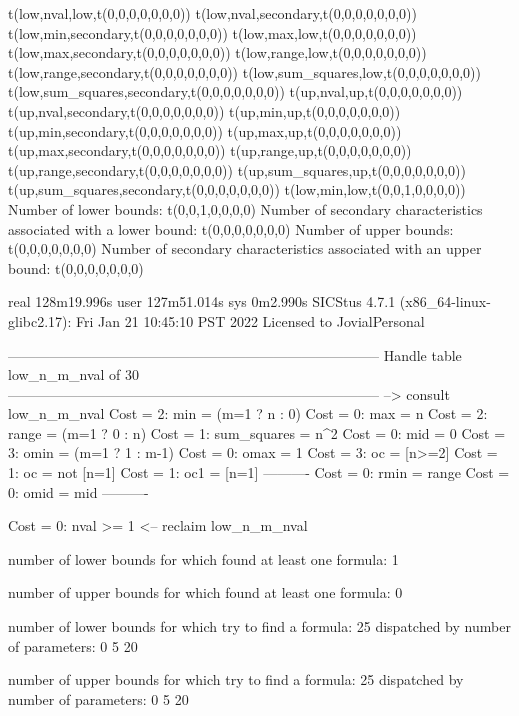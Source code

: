 t(low,nval,low,t(0,0,0,0,0,0,0))
t(low,nval,secondary,t(0,0,0,0,0,0,0))
t(low,min,secondary,t(0,0,0,0,0,0,0))
t(low,max,low,t(0,0,0,0,0,0,0))
t(low,max,secondary,t(0,0,0,0,0,0,0))
t(low,range,low,t(0,0,0,0,0,0,0))
t(low,range,secondary,t(0,0,0,0,0,0,0))
t(low,sum_squares,low,t(0,0,0,0,0,0,0))
t(low,sum_squares,secondary,t(0,0,0,0,0,0,0))
t(up,nval,up,t(0,0,0,0,0,0,0))
t(up,nval,secondary,t(0,0,0,0,0,0,0))
t(up,min,up,t(0,0,0,0,0,0,0))
t(up,min,secondary,t(0,0,0,0,0,0,0))
t(up,max,up,t(0,0,0,0,0,0,0))
t(up,max,secondary,t(0,0,0,0,0,0,0))
t(up,range,up,t(0,0,0,0,0,0,0))
t(up,range,secondary,t(0,0,0,0,0,0,0))
t(up,sum_squares,up,t(0,0,0,0,0,0,0))
t(up,sum_squares,secondary,t(0,0,0,0,0,0,0))
t(low,min,low,t(0,0,1,0,0,0,0))
Number of lower bounds:                                             t(0,0,1,0,0,0,0)
Number of secondary characteristics associated with a lower bound:  t(0,0,0,0,0,0,0)
Number of upper bounds:                                             t(0,0,0,0,0,0,0)
Number of secondary characteristics associated with an upper bound: t(0,0,0,0,0,0,0)

real	128m19.996s
user	127m51.014s
sys	0m2.990s
SICStus 4.7.1 (x86_64-linux-glibc2.17): Fri Jan 21 10:45:10 PST 2022
Licensed to JovialPersonal


--------------------------------------------------------------------------------
Handle table low_n_m_nval of 30
--------------------------------------------------------------------------------
--> consult low_n_m_nval
Cost =  2:  min         = (m=1 ? n : 0)
Cost =  0:  max         = n
Cost =  2:  range       = (m=1 ? 0 : n)
Cost =  1:  sum_squares = n^2
Cost =  0:  mid         = 0
Cost =  3:  omin        = (m=1 ? 1 : m-1)
Cost =  0:  omax        = 1
Cost =  3:  oc          = [n>=2]
Cost =  1:  oc          = not [n=1]
Cost =  1:  oc1         = [n=1]
----------
Cost =  0:  rmin        = range
Cost =  0:  omid        = mid
----------

Cost =  0:  nval >= 1
<-- reclaim low_n_m_nval

number of lower bounds for which found at least one formula: 1

number of upper bounds for which found at least one formula: 0

number of lower bounds for which try to find a formula: 25
dispatched by number of parameters: 0  5  20

number of upper bounds for which try to find a formula: 25
dispatched by number of parameters: 0  5  20

